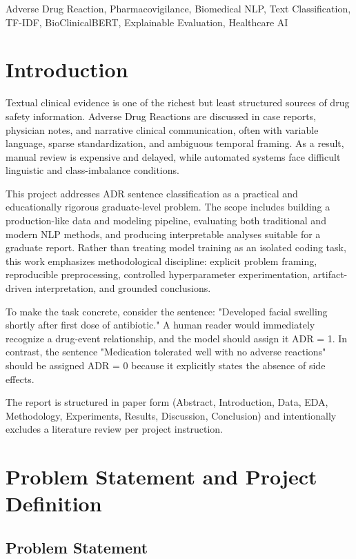 \documentclass[11pt]{article}
\begin{document}
Adverse Drug Reaction, Pharmacovigilance, Biomedical NLP, Text Classification, TF-IDF, BioClinicalBERT, Explainable Evaluation, Healthcare AI


\section{Introduction}

Textual clinical evidence is one of the richest but least structured sources of drug safety information. Adverse Drug Reactions are discussed in case reports, physician notes, and narrative clinical communication, often with variable language, sparse standardization, and ambiguous temporal framing. As a result, manual review is expensive and delayed, while automated systems face difficult linguistic and class-imbalance conditions.


This project addresses ADR sentence classification as a practical and educationally rigorous graduate-level problem. The scope includes building a production-like data and modeling pipeline, evaluating both traditional and modern NLP methods, and producing interpretable analyses suitable for a graduate report. Rather than treating model training as an isolated coding task, this work emphasizes methodological discipline: explicit problem framing, reproducible preprocessing, controlled hyperparameter experimentation, artifact-driven interpretation, and grounded conclusions.


To make the task concrete, consider the sentence: "Developed facial swelling shortly after first dose of antibiotic." A human reader would immediately recognize a drug-event relationship, and the model should assign it ADR = 1. In contrast, the sentence "Medication tolerated well with no adverse reactions" should be assigned ADR = 0 because it explicitly states the absence of side effects.


The report is structured in paper form (Abstract, Introduction, Data, EDA, Methodology, Experiments, Results, Discussion, Conclusion) and intentionally excludes a literature review per project instruction.


\section{Problem Statement and Project Definition}

\subsection{Problem Statement}
\end{document}
